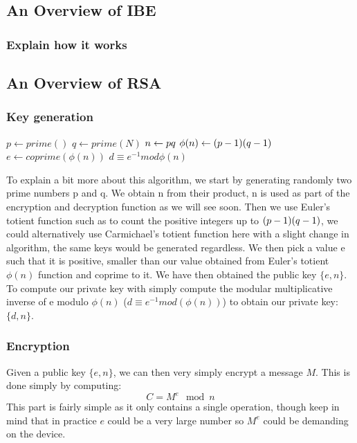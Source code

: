 \documentclass[conference]{IEEEtran}
\begin{document}
\subsection{An Overview of IBE}
\subsubsection{Explain how it works}

\subsection{An Overview of RSA}
\subsubsection{Key generation}

\begin{algorithmic}
\STATE $p \leftarrow prime()$
\STATE $q \leftarrow prime(N)$
\STATE $n \leftarrow p \* q$
\STATE $\phi (n) \leftarrow (p - 1) \* (q - 1)$
\STATE $e \leftarrow coprime(\phi (n))$
\STATE $d \equiv e^{-1} mod \phi(n)$
\end{algorithmic}
To explain a bit more about this algorithm, we start by generating randomly two prime numbers
p and q. We obtain n from their product, n is used as part of the encryption and decryption function
as we will see soon. Then we use Euler's totient function such as to count the positive integers
up to $(p - 1) \* (q - 1)$, we could alternatively use Carmichael's totient function here 
with a slight change in algorithm, the same keys would be generated regardless. We then pick a value e
such that it is positive, smaller than our value obtained from Euler's totient $\phi(n) $ function and coprime to it.
We have then obtained the public key $\{e,n\}$. To compute our private key with simply compute 
the modular multiplicative inverse of e modulo $\phi(n)$ ($d \equiv e^{-1} mod(\phi(n))$) to obtain
our private key: $\{d,n\}$.

\subsubsection{Encryption}
Given a public key $\{e,n\}$, we can then very simply encrypt a message $M$.
This is done simply by computing:
\begin{equation*}
    C = M^{e}\mod n
\end{equation*}
This part is fairly simple as it only contains a single operation, though keep in mind that
in practice $e$ could be a very large number so $M^{e}$ could be demanding on the device.
\end{document}
